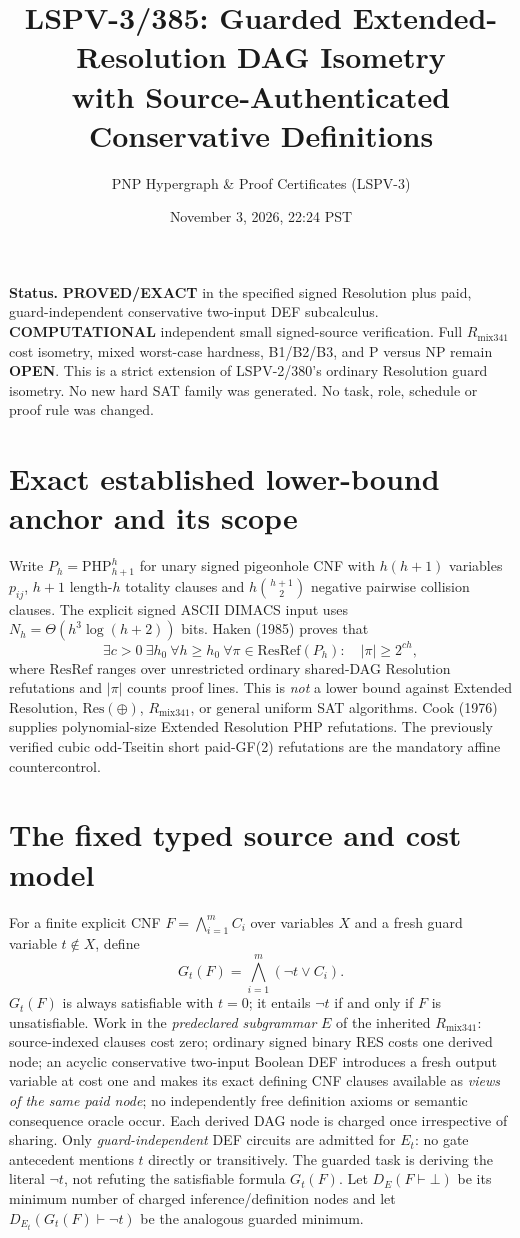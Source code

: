 \documentclass[11pt]{article}
\title{LSPV-3/385: Guarded Extended-Resolution DAG Isometry\\
with Source-Authenticated Conservative Definitions}
\author{PNP Hypergraph \& Proof Certificates (LSPV-3)}
\date{November 3, 2026, 22:24 PST}
\begin{document}
\maketitle

\noindent\textbf{Status.} \textbf{PROVED/EXACT} in the specified signed Resolution
plus paid, guard-independent conservative two-input DEF subcalculus.
\textbf{COMPUTATIONAL} independent small signed-source verification.
Full $R_{\mathrm{mix341}}$ cost isometry, mixed worst-case hardness, B1/B2/B3,
and P versus NP remain \textbf{OPEN}. This is a strict extension
of LSPV-2/380's ordinary Resolution guard isometry. No new hard SAT
family was generated. No task, role, schedule or proof rule was changed.

\section*{Exact established lower-bound anchor and its scope}
Write $P_h=\mathrm{PHP}_{h+1}^{h}$ for unary signed pigeonhole CNF
with $h(h+1)$ variables $p_{ij}$, $h+1$ length-$h$ totality clauses and
$h\binom{h+1}{2}$ negative pairwise collision clauses.
The explicit signed ASCII DIMACS input uses
$N_h=\Theta(h^3\log(h+2))$ bits. Haken (1985) proves that
\[
 \exists c>0\ \exists h_0\ \forall h\ge h_0\
 \forall\pi\in\mathrm{ResRef}(P_h):
 \quad |\pi|\ge 2^{ch},
\]
where $\mathrm{ResRef}$ ranges over unrestricted ordinary
shared-DAG Resolution refutations and $|\pi|$ counts proof lines.
This is \emph{not} a lower bound against Extended Resolution,
$\mathrm{Res}(\oplus)$, $R_{\mathrm{mix341}}$, or general uniform SAT algorithms.
Cook (1976) supplies polynomial-size Extended Resolution PHP refutations.
The previously verified cubic odd-Tseitin short paid-GF(2) refutations
are the mandatory affine countercontrol.

\section*{The fixed typed source and cost model}
For a finite explicit CNF $F=\bigwedge_{i=1}^m C_i$ over variables $X$
and a fresh guard variable $t\notin X$, define
\[
 G_t(F)=\bigwedge_{i=1}^m(\neg t\vee C_i).
\]
$G_t(F)$ is always satisfiable with $t=0$; it entails $\neg t$
if and only if $F$ is unsatisfiable. Work in the \emph{predeclared
subgrammar} $E$ of the inherited $R_{\mathrm{mix341}}$: source-indexed
clauses cost zero; ordinary signed binary RES costs one derived node;
an acyclic conservative two-input Boolean DEF introduces a fresh
output variable at cost one and makes its exact defining CNF clauses
available as \emph{views of the same paid node}; no independently
free definition axioms or semantic consequence oracle occur. Each
derived DAG node is charged once irrespective of sharing.
Only \emph{guard-independent} DEF circuits are admitted for $E_t$:
no gate antecedent mentions $t$ directly or transitively. The
guarded task is deriving the literal $\neg t$, not refuting the
satisfiable formula $G_t(F)$. Let $D_E(F\vdash\bot)$ be its minimum
number of charged inference/definition nodes and let
$D_{E_t}(G_t(F)\vdash\neg t)$ be the analogous guarded minimum.
\end{document}

